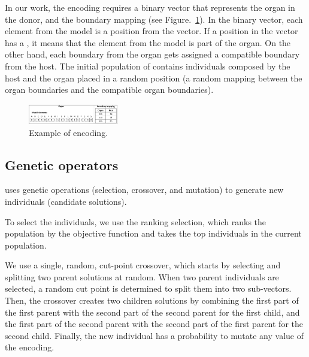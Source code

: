 In our work, the encoding requires a binary vector that represents the organ in the donor, and the boundary mapping (see Figure.~\ref{fig:encoding}). In the binary vector, each element from the model is a position from the vector. If a position in the vector has a , it means that the element from the model is part of the organ. On the other hand, each boundary from the organ gets assigned a compatible boundary from the host.
The initial population of \ApproachName{} contains individuals composed by the host and the organ placed in a random position (a random mapping between the organ boundaries and the compatible organ boundaries).

\begin{figure}[tb]
    \centering
    \includegraphics[width=0.35\textwidth]{Figures/encoding.png}
    \caption{Example of encoding.}
    \label{fig:encoding}
\end{figure}

\subsection{Genetic operators}

\ApproachName{} uses genetic operations (selection, crossover, and mutation) to generate new individuals (\ie candidate solutions). 

To select the individuals, we use the ranking selection, which ranks the population by the objective function and takes the top individuals in the current population.

We use a single, random, cut-point crossover, which starts by selecting and splitting two parent solutions at random. When two parent individuals are selected, a random cut point is determined to split them into two sub-vectors.
Then, the crossover creates two children solutions by combining the first part of the first parent with the second part of the second parent for the first child, and the first part of the second parent with the second part of the first parent for the second child.
Finally, the new individual has a probability to mutate any value of the encoding. 

